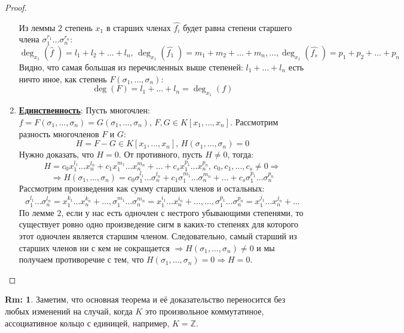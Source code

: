 \documentclass[12pt]{article}
\newcommand{\MZ}{\mathbb{Z}}
\theoremstyle{definition}
\newtheorem{rem}{Rm:}
\newcommand{\wht}[1]{\widehat{#1}}
\begin{document}
\begin{proof}
\begin{enumerate}[label=\arabic*)]
$$		$$
		Из леммы $2$ степень $x_1$ в старших членах $\wht{f_i}$ будет равна степени старшего члена $\sigma_1^{r_1}\dotsc\sigma_n^{r_n}$:
		$$
			\deg_{x_1}(\wht{f}\;) = l_1 + l_2 + \dotsc + l_n, \, \deg_{x_1}(\wht{f_1}\;) = m_1 + m_2 + \dotsc + m_n, \dotsc, \deg_{x_1}(\wht{f_s}\;) = p_1 + p_2 + \dotsc + p_n
		$$
		Видно, что самая большая из перечисленных выше степеней: $l_1 + \dotsc + l_n$ есть ничто иное, как степень  $F(\sigma_1,\dotsc,\sigma_n)$:
		$$
			\deg(F) = l_1 + \dotsc + l_n = \deg_{x_1}(f)
		$$
		\item \textbf{\uline{Единственность}}: Пусть многочлен: $f = F(\sigma_1,\dotsc,\sigma_n) = G(\sigma_1,\dotsc,\sigma_n), \, F,G \in K[x_1,\dotsc,x_n]$. Рассмотрим разность многочленов $F$ и $G$:
		$$
			H = F - G \in K[x_1,\dotsc,x_n], \, H(\sigma_1,\dotsc,\sigma_n) = 0
		$$
		Нужно доказать, что $H = 0$. От противного, пусть $H \neq 0$, тогда:
		$$
			H = c_0x_1^{l_1}\dotsc x_n^{l_n} + c_1x_1^{m_1}\dotsc x_n^{m_n} + \dotsc + c_sx_1^{p_1}\dotsc x_n^{p_n}, \, c_0,c_1, \dotsc, c_s \neq 0 \Rightarrow
		$$
		$$
			\Rightarrow H(\sigma_1,\dotsc,\sigma_n) =  c_0\sigma_1^{l_1}\dotsc \sigma_n^{l_n} + c_1\sigma_1^{m_1}\dotsc \sigma_n^{m_n} + \dotsc + c_s\sigma_1^{p_1}\dotsc \sigma_n^{p_n}
		$$
		Рассмотрим произведения как сумму старших членов и остальных:
		$$
			\sigma_1^{l_1}\dotsc \sigma_n^{l_n} = x_1^{k_1}\dotsc x_n^{k_n} + \dotsc, \sigma_1^{m_1}\dotsc \sigma_n^{m_n} = x_1^{i_1}\dotsc x_n^{i_n} + \dotsc, \dotsc, \sigma_1^{p_1}\dotsc \sigma_n^{p_n} = x_1^{j_1}\dotsc x_n^{j_n} + \dotsc
		$$
		По лемме $2$, если у нас есть одночлен с нестрого убывающими степенями, то существует ровно одно произведение сигм в каких-то степенях для которого этот одночлен является старшим членом. Следовательно, самый старший из старших членов ни с кем не сокращается $\Rightarrow H(\sigma_1,\dotsc,\sigma_n) \neq 0$ и мы получаем противоречие с тем, что $H(\sigma_1, \dotsc,\sigma_n) = 0 \Rightarrow H = 0$.
	\end{enumerate}
\end{proof}

\begin{rem}
	Заметим, что основная теорема и её доказательство переносится без любых изменений на случай, когда $K$ это произвольное коммутатиное, ассоциативное кольцо с единицей, например, $K = \MZ$.
\end{rem}
\newpage
\end{document}
